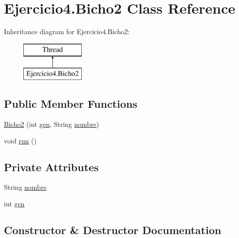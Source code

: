 \hypertarget{class_ejercicio4_1_1_bicho2}{}\section{Ejercicio4.\+Bicho2 Class Reference}
\label{class_ejercicio4_1_1_bicho2}
Inheritance diagram for Ejercicio4.\+Bicho2\+:\begin{figure}[H]
\begin{center}
\leavevmode
\includegraphics[height=2.000000cm]{class_ejercicio4_1_1_bicho2}
\end{center}
\end{figure}
\subsection*{Public Member Functions}
\begin{DoxyCompactItemize}
\item 
\mbox{\hyperlink{class_ejercicio4_1_1_bicho2_a0317dd47a7f91ecddd5985c6a328afd4}{Bicho2}} (int \mbox{\hyperlink{class_ejercicio4_1_1_bicho2_a52c8486d264ae216ff0dd1d6c08f8916}{gen}}, String \mbox{\hyperlink{class_ejercicio4_1_1_bicho2_a2afa745208a498ecffc1b2843bc0da82}{nombre}})
\item 
void \mbox{\hyperlink{class_ejercicio4_1_1_bicho2_aae5ca96ca417369d0f5c05daf12fe3c5}{run}} ()
\end{DoxyCompactItemize}
\subsection*{Private Attributes}
\begin{DoxyCompactItemize}
\item 
String \mbox{\hyperlink{class_ejercicio4_1_1_bicho2_a2afa745208a498ecffc1b2843bc0da82}{nombre}}
\item 
int \mbox{\hyperlink{class_ejercicio4_1_1_bicho2_a52c8486d264ae216ff0dd1d6c08f8916}{gen}}
\end{DoxyCompactItemize}


\subsection{Constructor \& Destructor Documentation}
\mbox{\label{class_ejercicio4_1_1_bicho2_a0317dd47a7f91ecddd5985c6a328afd4}} 
